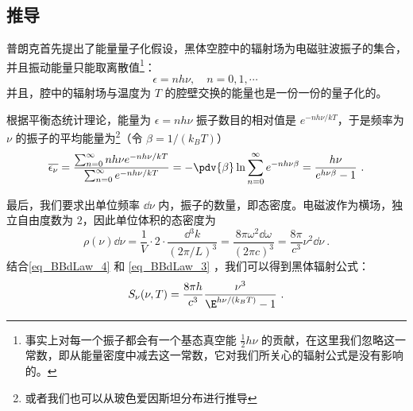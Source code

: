 \subsection{推导}
普朗克首先提出了能量量子化假设，黑体空腔中的辐射场为电磁驻波振子的集合，并且振动能量只能取离散值\footnote{事实上对每一个振子都会有一个基态真空能 $\frac{1}{2}h\nu$ 的贡献，在这里我们忽略这一常数，即从能量密度中减去这一常数，它对我们所关心的辐射公式是没有影响的。}：
\begin{equation}
\epsilon = nh\nu, \quad n=0,1,\cdots~
\end{equation}
并且，腔中的辐射场与温度为 $T$ 的腔壁交换的能量也是一份一份的量子化的。

根据平衡态统计理论，能量为 $\epsilon=nh\nu$ 振子数目的相对值是 $e^{-nh\nu/kT}$，于是频率为 $\nu$ 的振子的平均能量为\footnote{或者我们也可以从玻色爱因斯坦分布进行推导}（令 $\beta = 1/(k_BT)$）
\begin{equation}\label{eq_BBdLaw_4}
\overline{\epsilon_\nu}=\frac{\sum_{n=0}^\infty nh\nu e^{-nh\nu/kT}}{\sum_{n=0}^\infty e^{-nh\nu/kT}}=-\pdv{\beta}\ln \sum_{n=0}^\infty e^{-nh\nu\beta}=\frac{h\nu}{e^{h\nu\beta}-1}~.
\end{equation}

最后，我们要求出单位频率 $\dd \nu$ 内，振子的数量，即态密度。电磁波作为横场，独立自由度数为 $2$，因此单位体积的态密度为
\begin{equation}\label{eq_BBdLaw_3}
\rho(\nu) \dd \nu= \frac{1}{V}\cdot 2\cdot \frac{\dd{} ^3 k}{(2\pi/L)^3}=\frac{8\pi \omega^2 \dd \omega}{(2\pi c)^3}= \frac{8\pi}{c^3}\nu^2\dd \nu~.
\end{equation}
结合\autoref{eq_BBdLaw_4} 和 \autoref{eq_BBdLaw_3} ，我们可以得到黑体辐射公式：
\begin{equation}
S_\nu(\nu,T) = \frac{8\pi h}{c^3}\frac{\nu^3}{\E^{h\nu/(k_B T)} - 1}~.
\end{equation}
